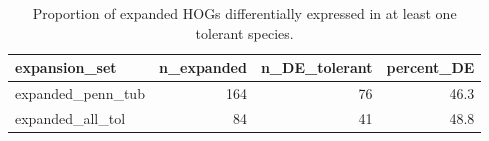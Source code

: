 \begin{table}

\caption{Proportion of expanded HOGs differentially expressed in at least one tolerant species.}
\centering
\begin{tabular}[t]{lrrr}
\toprule
expansion\_set & n\_expanded & n\_DE\_tolerant & percent\_DE\\
\midrule
expanded\_penn\_tub & 164 & 76 & 46.3\\
expanded\_all\_tol & 84 & 41 & 48.8\\
\bottomrule
\end{tabular}
\end{table}
